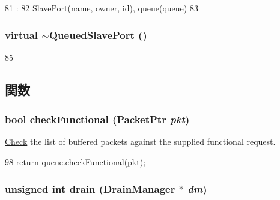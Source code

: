 \begin{DoxyCode}
81                                                                         :
82         SlavePort(name, owner, id), queue(queue)
83     { }

\end{DoxyCode}
\hypertarget{classQueuedSlavePort_a15b90c8a70a02ac8423cf5cd5b24bbb4}{
\subsubsection[{$\sim$QueuedSlavePort}]{\setlength{\rightskip}{0pt plus 5cm}virtual $\sim${\bf QueuedSlavePort} ()}}
\label{classQueuedSlavePort_a15b90c8a70a02ac8423cf5cd5b24bbb4}



\begin{DoxyCode}
85 { }
\end{DoxyCode}


\subsection{関数}
\hypertarget{classQueuedSlavePort_a8eb60d4744b6212ad749f3a586759266}{
\subsubsection[{checkFunctional}]{\setlength{\rightskip}{0pt plus 5cm}bool checkFunctional ({\bf PacketPtr} {\em pkt})}}
\label{classQueuedSlavePort_a8eb60d4744b6212ad749f3a586759266}
\hyperlink{classCheck}{Check} the list of buffered packets against the supplied functional request. 


\begin{DoxyCode}
98 { return queue.checkFunctional(pkt); }
\end{DoxyCode}
\hypertarget{classQueuedSlavePort_aa8a18d230dba7a674ac8a0b4f35bc36a}{
\subsubsection[{drain}]{\setlength{\rightskip}{0pt plus 5cm}unsigned int drain ({\bf DrainManager} $\ast$ {\em dm})}}
\label{classQueuedSlavePort_aa8a18d230dba7a674ac8a0b4f35bc36a}



